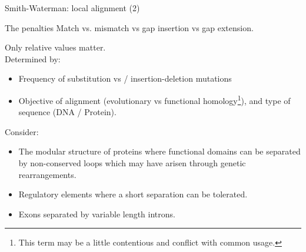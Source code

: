 \documentclass[pdf]{beamer}
\begin{document}

\begin{frame}{Smith-Waterman: local alignment (2)}
  \begin{figure}[ht]
    \begin{tikzpicture}[scale=0.5]
      
    \end{tikzpicture}
  \end{figure}
\end{frame}



\begin{frame}{The penalties}
  Match vs. mismatch vs gap insertion vs gap extension.
  
  Only relative values matter.\\ 
  Determined by:
  
  \begin{itemize}
  \item Frequency of substitution vs / insertion-deletion mutations
  \item Objective of alignment (evolutionary vs functional
    homology\footnote{This term may be a little contentious and conflict with
      common usage.}),
  and type of sequence (DNA / Protein). 
  \end{itemize}

  \pause
  Consider:
  \begin{itemize}
  \item The modular structure of proteins where functional domains
    can be separated by non-conserved loops which may have arisen
    through genetic rearrangements.
  \item Regulatory elements where a short separation can be tolerated.
  \item Exons separated by variable length introns.
  \end{itemize}

\end{frame}
\end{document}
